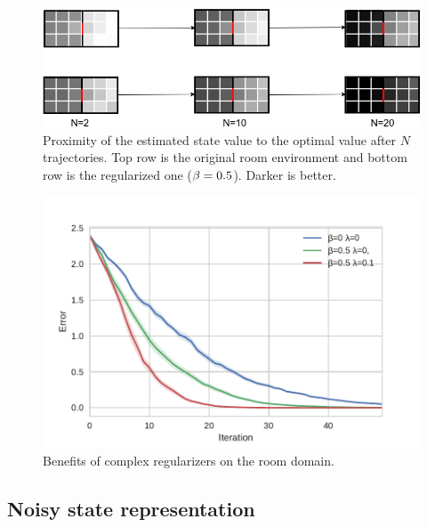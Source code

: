 \begin{figure}
    \centering
    \includegraphics[scale=0.44]{./fig/room.png}
    \caption[Propagation of the information]{Proximity of the estimated state value to the optimal value after $N$ trajectories. Top row is the original room environment and bottom row is the regularized one ($\beta = 0.5$). Darker is better.}
    \label{fig:room}
\end{figure}
\begin{figure}[H]
\centering
\includegraphics[scale=0.60]{./fig/room_perf.pdf}
\caption[Complex regularizers]{Benefits of complex regularizers on the room domain.}
\label{fig:room_perf}
\end{figure}



\subsection{Noisy state representation}
\label{sec:expe:noisy_state}


